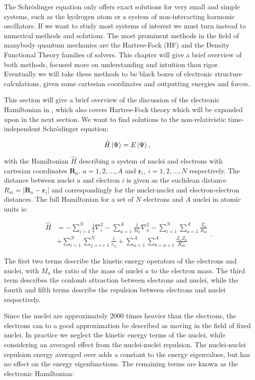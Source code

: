 The Schr\"{o}dinger equation only offers exact solutions
for very small and simple systems, such as the hydrogen atom
or a system of non-interacting harmonic oscillators.
If we want to study most systems of interest we must turn
instead to numerical methods and solutions.
The most prominent methods in the field of manybody
quantum mechanics are the Hartree-Fock (HF) and the
Density Functional Theory families of solvers.
This chapter will give a brief overview of both methods,
focused more on understanding and intuition than rigor.
Eventually we will take these methods to be black boxes of
electronic structure calculations, given some cartesian
coordinates and outputting energies and forces.
\par
This section will give a brief overview of the discussion
of the electronic Hamiltonian in \parencite[Szabo][pages 39-89]
{szabo1996modern}, which also covers Hartree-Fock theory
which will be expanded upon in the next section.
We want to find solutions to the non-relativistic time-independent
Schr\"{o}dinger equation:

$$ \hat{H} \ket{\Psi} = E \ket{\Psi} ,$$

with the Hamiltonian $\hat{H}$ describing a system of nuclei and electrons
with cartesian coordinates $\bm{R}_a, \ a=1,2,\dots,A$ and $\bm{r}_i, \
i=1,2,\dots,N$ respectively. The distance between nuclei $a$
and electron $i$ is given as the euclidean distance
$R_{ai} = \left| \bm{R}_a - \bm{r}_i \right|$
and correspondingly for the nuclei-nuclei and electron-electron distances.
The full Hamiltonian for a set of $N$ electrons and $A$ nuclei
in atomic units is:

\begin{equation}
    \begin{split}
        \hat{H}
        &= -\sum_{i=1}^N \frac{1}{2} \nabla_i^2
        -\sum_{a=1}^A \frac{1}{M_a} \nabla_a^2
        -\sum_{i=1}^N \sum_{a=1}^A \frac{Z_a}{R_{ia}} \\
        &+ \sum_{i=1}^N \sum_{j=i+1}^N \frac{1}{r_{ij}}
        + \sum_{a=1}^A \sum_{b=a+1}^A \frac{Z_a Z_b}{R_{ab}}
    \end{split} .
\end{equation}

The first two terms describe the kinetic energy operators
of the electrons and nuclei, with $M_a$ the ratio of the mass
of nuclei $a$ to the electron mass. The third term describes the
coulomb attraction between electrons and nuclei, while the fourth and fifth
terms describe the repulsion between electrons and nuclei respectively.
\par
Since the nuclei are approximately 2000 times heavier
than the electrons, the electrons can to a good approximation
be described as moving in the field of fixed nuclei. In practice we
neglect the kinetic energy terms of the nuclei, while considering
an averaged effect from the nuclei-nuclei repulsion.
The nuclei-nuclei repulsion energy averaged over 
adds a constant to the energy
eigenvalues, but has no effect on the energy eigenfunctions.
The remaining terms are known as the electronic Hamiltonian:

